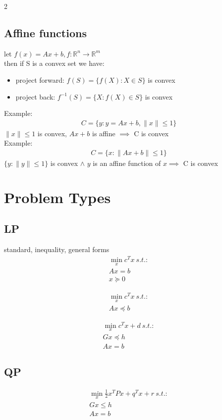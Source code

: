 \documentclass[8pt]{extarticle}
\newcommand{\R}{\mathbb{R}}
\newcommand{\norm}[1]{\|#1\|}
\begin{document}
\begin{multicols*}{2}
  \subsection{Affine functions}
  let $f(x)=Ax+b, f:\R^n \to \R^m$\\
  then if S is a convex set we have:
  \begin{itemize}
  \item project forward: $f(S) = \{ f(X) : X \in S \}$ is convex
  \item project back: $f^{-1}(S) = \{ X : f(X) \in S \}$ is convex
  \end{itemize}
  Example:
  \begin{align*}
    C = \{ y : y=Ax+b, \norm{x} \leq 1\}
  \end{align*}
  $\norm{x} \leq 1$ is convex, $Ax+b$ is affine $\implies$ C is convex\\
  Example:
  \begin{align*}
    C = \{ x : \norm{Ax+b} \leq 1 \}
  \end{align*}
    $\{y: \norm{y} \leq 1 \}$ is convex $\wedge$ $y$ is an affine function of $x \implies$ C is convex\\

  \vfill\null
  \pagebreak

  \section{Problem Types}
  \subsection*{LP}
  standard, inequality, general forms
  \begin{align*}
    \min_x c^Tx\ s.t.:\\
         Ax = b\\
         x \succeq 0
  \end{align*}

  \begin{align*}
    \min_x c^Tx\ s.t.:\\
    Ax \preceq b
  \end{align*}

  \begin{align*}
    \min_x c^Tx+d\ s.t.:\\
    Gx \preceq h\\
    Ax = b
  \end{align*}
  
  \subsection*{QP}
  \begin{align*}
    \min_x \frac{1}{2} x^T P x + q^T x + r\ s.t.:\\
    Gx \leq h\\
    Ax = b
  \end{align*}

\end{multicols*}
\end{document}
